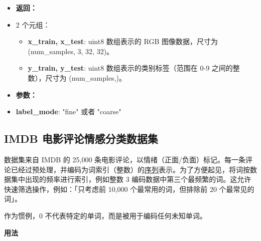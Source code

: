 \begin{itemize}
\tightlist
\item
  \textbf{返回：}
\item
  2 个元组：

  \begin{itemize}
  \tightlist
  \item
    \textbf{x\_train, x\_test}: uint8 数组表示的 RGB 图像数据，尺寸为
    (num\_samples, 3, 32, 32)。
  \item
    \textbf{y\_train, y\_test}: uint8 数组表示的类别标签（范围在 0-9
    之间的整数），尺寸为 (num\_samples,)。
  \end{itemize}
\item
  \textbf{参数：}
\item
  \textbf{label\_mode}: "fine" 或者 "coarse"
\end{itemize}


\subsection{IMDB
电影评论情感分类数据集}\label{imdb-ux7535ux5f71ux8bc4ux8bbaux60c5ux611fux5206ux7c7bux6570ux636eux96c6}

数据集来自 IMDB 的 25,000
条电影评论，以情绪（正面/负面）标记。每一条评论已经过预处理，并编码为词索引（整数）的\hyperref[preprocessing-sequence]{序列}表示。为了方便起见，将词按数据集中出现的频率进行索引，例如整数
3 编码数据中第三个最频繁的词。这允许快速筛选操作，例如：「只考虑前
10,000 个最常用的词，但排除前 20 个最常见的词」。

作为惯例，0 不代表特定的单词，而是被用于编码任何未知单词。

\textbf{用法}\label{ux7528ux6cd5-2}

\begin{Shaded}
\begin{Highlighting}[]
  

\OperatorTok{=} \OperatorTok{=}\NormalTok{,}
                                                      \OperatorTok{=}\NormalTok{,}
                                                      \OperatorTok{=}\NormalTok{,}
                                                      \OperatorTok{=}\NormalTok{,}
                                                      \OperatorTok{=}\NormalTok{,}
                                                      \OperatorTok{=}\NormalTok{,}
                                                      \OperatorTok{=}\NormalTok{,}
                                                      \OperatorTok{=}\NormalTok{)}
\end{Highlighting}
\end{Shaded}

